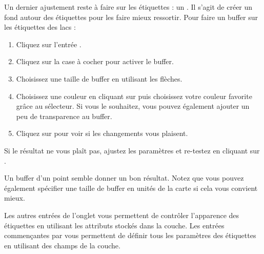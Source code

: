 Un dernier ajustement reste à faire sur les étiquettes : un . Il s'agit de créer un fond autour des étiquettes pour les faire mieux ressortir. Pour faire un buffer sur les étiquettes des lacs :

\begin{enumerate}
\item Cliquez sur l'entrée .
\item Cliquez sur la case à cocher  pour activer le buffer.
\item Choisissez une taille de buffer en utilisant les flèches.
\item Choisissez une couleur en cliquant sur  puis choisissez votre couleur favorite grâce au sélecteur. Si vous le souhaitez, vous pouvez également ajouter un peu de transparence au buffer.
\item Cliquez sur  pour voir si les changements vous plaisent.
\end{enumerate}

Si le résultat ne vous plaît pas, ajustez les paramètres et re-testez en cliquant sur .

Un buffer d'un point semble donner un bon résultat. Notez que vous pouvez également spécifier une taille de buffer en unités de la carte si cela vous convient mieux.

Les autres entrées de l'onglet  vous permettent de contrôler l'apparence des étiquettes en utilisant les attributs stockés dans la couche. Les entrées commençantes par  vous permettent de définir tous les paramètres des étiquettes en utilisant des champs de la couche.


